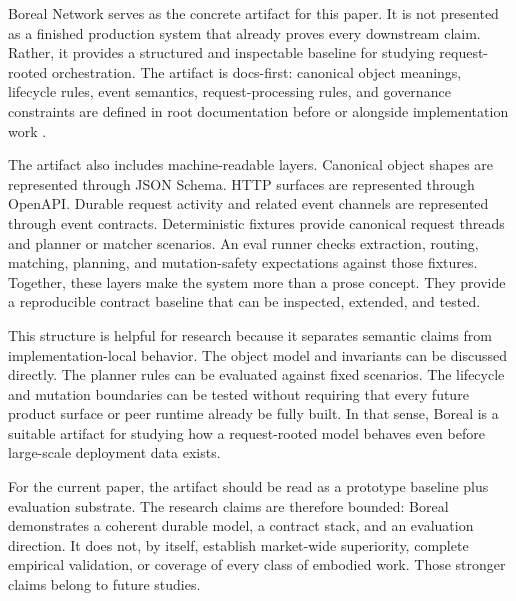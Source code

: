 Boreal Network serves as the concrete artifact for this paper. It is not presented as a finished production system that already proves every downstream claim. Rather, it provides a structured and inspectable baseline for studying request-rooted orchestration. The artifact is docs-first: canonical object meanings, lifecycle rules, event semantics, request-processing rules, and governance constraints are defined in root documentation before or alongside implementation work \cite{boreal_repo_2026,boreal_network_thesis_2026,boreal_request_processing_2026}.

The artifact also includes machine-readable layers. Canonical object shapes are represented through JSON Schema. HTTP surfaces are represented through OpenAPI. Durable request activity and related event channels are represented through event contracts. Deterministic fixtures provide canonical request threads and planner or matcher scenarios. An eval runner checks extraction, routing, matching, planning, and mutation-safety expectations against those fixtures. Together, these layers make the system more than a prose concept. They provide a reproducible contract baseline that can be inspected, extended, and tested.

This structure is helpful for research because it separates semantic claims from implementation-local behavior. The object model and invariants can be discussed directly. The planner rules can be evaluated against fixed scenarios. The lifecycle and mutation boundaries can be tested without requiring that every future product surface or peer runtime already be fully built. In that sense, Boreal is a suitable artifact for studying how a request-rooted model behaves even before large-scale deployment data exists.

For the current paper, the artifact should be read as a prototype baseline plus evaluation substrate. The research claims are therefore bounded: Boreal demonstrates a coherent durable model, a contract stack, and an evaluation direction. It does not, by itself, establish market-wide superiority, complete empirical validation, or coverage of every class of embodied work. Those stronger claims belong to future studies.
